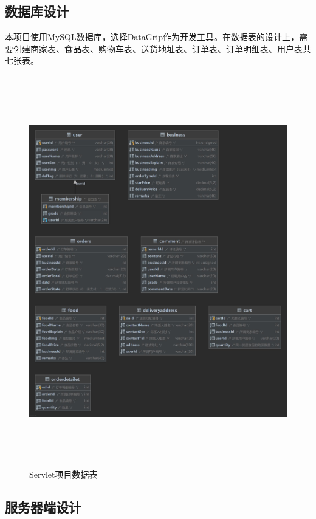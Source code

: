 \subsection{数据库设计}
本项目使用MySQL数据库，选择DataGrip作为开发工具。在数据表的设计上，需要创建商家表、食品表、购物车表、送货地址表、订单表、订单明细表、用户表共七张表。
\begin{figure}[H]
    \centering
    \includegraphics[width=15cm,height=17cm]{figures/table2.jpg}
    \caption{Servlet项目数据表}
\end{figure}

\subsection{服务器端设计}



